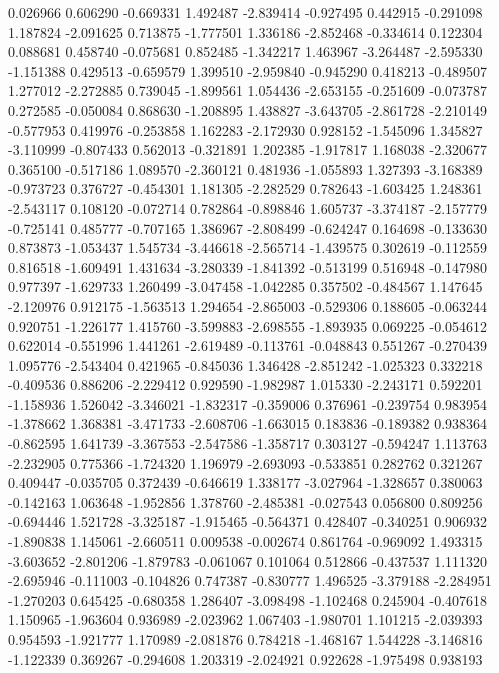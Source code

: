0.026966
0.606290
-0.669331
1.492487
-2.839414
-0.927495
0.442915
-0.291098
1.187824
-2.091625
0.713875
-1.777501
1.336186
-2.852468
-0.334614
0.122304
0.088681
0.458740
-0.075681
0.852485
-1.342217
1.463967
-3.264487
-2.595330
-1.151388
0.429513
-0.659579
1.399510
-2.959840
-0.945290
0.418213
-0.489507
1.277012
-2.272885
0.739045
-1.899561
1.054436
-2.653155
-0.251609
-0.073787
0.272585
-0.050084
0.868630
-1.208895
1.438827
-3.643705
-2.861728
-2.210149
-0.577953
0.419976
-0.253858
1.162283
-2.172930
0.928152
-1.545096
1.345827
-3.110999
-0.807433
0.562013
-0.321891
1.202385
-1.917817
1.168038
-2.320677
0.365100
-0.517186
1.089570
-2.360121
0.481936
-1.055893
1.327393
-3.168389
-0.973723
0.376727
-0.454301
1.181305
-2.282529
0.782643
-1.603425
1.248361
-2.543117
0.108120
-0.072714
0.782864
-0.898846
1.605737
-3.374187
-2.157779
-0.725141
0.485777
-0.707165
1.386967
-2.808499
-0.624247
0.164698
-0.133630
0.873873
-1.053437
1.545734
-3.446618
-2.565714
-1.439575
0.302619
-0.112559
0.816518
-1.609491
1.431634
-3.280339
-1.841392
-0.513199
0.516948
-0.147980
0.977397
-1.629733
1.260499
-3.047458
-1.042285
0.357502
-0.484567
1.147645
-2.120976
0.912175
-1.563513
1.294654
-2.865003
-0.529306
0.188605
-0.063244
0.920751
-1.226177
1.415760
-3.599883
-2.698555
-1.893935
0.069225
-0.054612
0.622014
-0.551996
1.441261
-2.619489
-0.113761
-0.048843
0.551267
-0.270439
1.095776
-2.543404
0.421965
-0.845036
1.346428
-2.851242
-1.025323
0.332218
-0.409536
0.886206
-2.229412
0.929590
-1.982987
1.015330
-2.243171
0.592201
-1.158936
1.526042
-3.346021
-1.832317
-0.359006
0.376961
-0.239754
0.983954
-1.378662
1.368381
-3.471733
-2.608706
-1.663015
0.183836
-0.189382
0.938364
-0.862595
1.641739
-3.367553
-2.547586
-1.358717
0.303127
-0.594247
1.113763
-2.232905
0.775366
-1.724320
1.196979
-2.693093
-0.533851
0.282762
0.321267
0.409447
-0.035705
0.372439
-0.646619
1.338177
-3.027964
-1.328657
0.380063
-0.142163
1.063648
-1.952856
1.378760
-2.485381
-0.027543
0.056800
0.809256
-0.694446
1.521728
-3.325187
-1.915465
-0.564371
0.428407
-0.340251
0.906932
-1.890838
1.145061
-2.660511
0.009538
-0.002674
0.861764
-0.969092
1.493315
-3.603652
-2.801206
-1.879783
-0.061067
0.101064
0.512866
-0.437537
1.111320
-2.695946
-0.111003
-0.104826
0.747387
-0.830777
1.496525
-3.379188
-2.284951
-1.270203
0.645425
-0.680358
1.286407
-3.098498
-1.102468
0.245904
-0.407618
1.150965
-1.963604
0.936989
-2.023962
1.067403
-1.980701
1.101215
-2.039393
0.954593
-1.921777
1.170989
-2.081876
0.784218
-1.468167
1.544228
-3.146816
-1.122339
0.369267
-0.294608
1.203319
-2.024921
0.922628
-1.975498
0.938193

